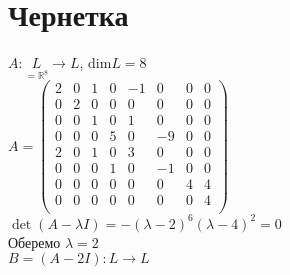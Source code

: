 \documentclass[a4paper, 14pt]{extarticle}
\def\dim#1{\textrm{dim} {#1}}
\begin{document}
\section*{Чернетка}
$A: \underset{= \mathbb{R}^8}{L} \to L$, $\dim L = 8$\\
$A = \begin{pmatrix}
2 & 0 & 1 & 0 & -1 & 0 & 0 & 0 \\
0 & 2 & 0 & 0 & 0 & 0 & 0 & 0 \\
0 & 0 & 1 & 0 & 1 & 0 & 0 & 0 \\
0 & 0 & 0 & 5 & 0 & -9 & 0 & 0 \\
2 & 0 & 1 & 0 & 3 & 0 & 0 & 0 \\
0 & 0 & 0 & 1 & 0 & -1 & 0 & 0 \\
0 & 0 & 0 & 0 & 0 & 0 & 4 & 4 \\
0 & 0 & 0 & 0 & 0 & 0 & 0 & 4 \\
\end{pmatrix}$\\
$\det (A - \lambda I) = -(\lambda - 2)^6 (\lambda - 4)^2 = 0$\\
Оберемо $\lambda = 2$\\
$B = (A - 2I): L \to L$\\
\end{document}
